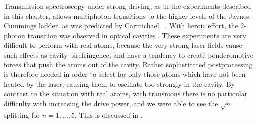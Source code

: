 Transmission spectroscopy under strong driving, as in the experiments described in this chapter, allows multiphoton transitions to the higher levels of the Jaynes--Cummings ladder, as was predicted by Carmichael \etal~\cite{carm2}. With heroic effort, the 2-photon transition was observed in optical cavities \cite{schuster_nonlinear_2008}. These experiments are very difficult to perform with real atoms, because the very strong laser fields cause such effects as cavity birefringence, and have a tendency to create ponderomotive forces that push the atoms out of the cavity. Rather sophisticated postprocessing is therefore needed in order to select for only those atoms which have not been heated by the laser, causing them to oscillate too strongly in the cavity. By contrast to the situation with real atoms, with transmons there is no particular difficulty with increasing the drive power, and we were able to see the $\sqrt{n}$ splitting for $n=1,\ldots,5$. This is discussed in .

